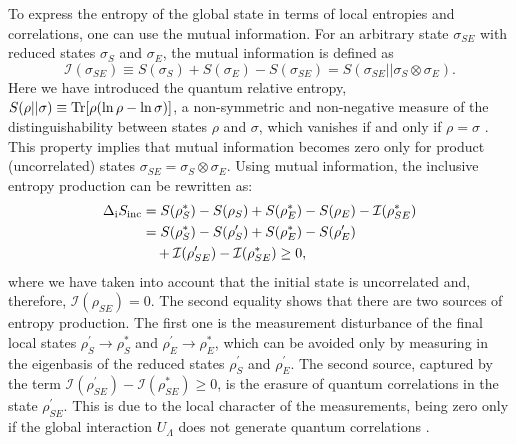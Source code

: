\documentclass[aps,prx,twocolumn,showpacs,floatfix,superscriptaddress,graphics,longbibliography]{revtex4-1}
\begin{document}
To express the entropy of the global state in terms of local entropies and correlations, one can use the mutual information. 
For an arbitrary state  $\sigma_{SE}$ with reduced states $\sigma_S$ and $\sigma_E$, the mutual information is defined as
\begin{equation}\label{m_info}
 \mathcal{I}({\sigma_{SE}}) \equiv  S(\sigma_S) + S(\sigma_E) - S(\sigma_{SE})  = S(\sigma_{SE} || \sigma_S \otimes \sigma_E). 
\end{equation} 
Here we have introduced the quantum relative entropy,  $S(\rho || \sigma) \equiv {\rm Tr}[\rho (\ln \rho - \ln \sigma)]$, a non-symmetric and non-negative measure 
of the distinguishability  between  states $\rho$ and $\sigma$, which vanishes if and only if $\rho = \sigma$ \cite{NielsenChuang}. This property implies that  
mutual information becomes zero only for product (uncorrelated) states $\sigma_{SE} = \sigma_S \otimes \sigma_E$.
Using  mutual information, the inclusive entropy production can be rewritten as:
\begin{align}\label{sq2}
  \Delta_{\rm i} S_{\rm inc} & = S(\rho_S^\ast) - S( \rho_S) +  S(\rho_E^\ast) - S(\rho_E) - \mathcal{I}(\rho_{SE}^\ast) \nonumber \\
   & =  S(\rho_S^\ast) - S( \rho_S^\prime) +  S(\rho_E^\ast) - S(\rho_E^\prime)  \nonumber \\
   & ~~~ +  \mathcal{I}(\rho_{SE}^\prime) - \mathcal{I}(\rho_{SE}^\ast) \geq 0, 
\end{align}
where we have taken into account that the initial state is uncorrelated and, therefore, $\mathcal{I}(\rho_{SE})=0$. The second equality shows that there are two sources of entropy production. 
The first one is the measurement disturbance of the final local states $\rho_S^\prime \rightarrow \rho_S^\ast$ and $\rho_E^\prime \rightarrow \rho_E^\ast$, 
which can be  avoided  only by measuring in the eigenbasis of the reduced states $\rho_S^\prime$ and $\rho_E^\prime$. The second source, captured by the term 
$\mathcal{I}(\rho_{SE}^\prime) - \mathcal{I}(\rho_{SE}^\ast) \geq 0 $, is the erasure of quantum correlations in the state $\rho_{SE}^\prime$. This is due to the local character of 
the measurements, being zero only if the global interaction $U_{\Lambda}$ does not generate quantum correlations \cite{Luo08, ModiRev}.
\end{document}
